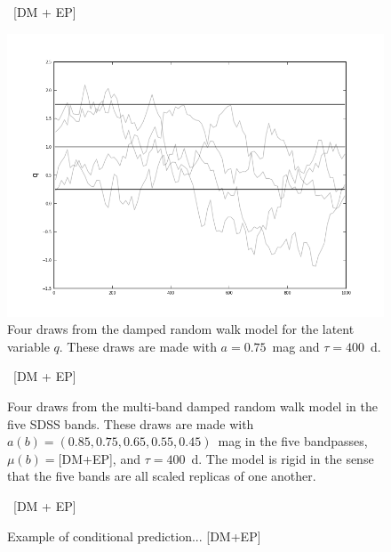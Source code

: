 \documentclass[letterpaper,12pt,preprint]{aastex}
\begin{document}
\clearpage
\begin{figure}
~[DM + EP]~
\caption{Four draws from the damped random walk model for the latent
  variable $q$.  These draws are made with $a=0.75$~mag and
  $\tau=400$~d.\label{fig:qdraws}}
\includegraphics [width=\textwidth]{latentvar.png}
\end{figure}

\begin{figure}
~[DM + EP]~
\caption{Four draws from the multi-band damped random walk model in
  the five SDSS bands.  These draws are made with $a(b)=(0.85, 0.75,
  0.65, 0.55, 0.45)$~mag in the five bandpasses, $\mu(b)=$[DM+EP], and
  $\tau=400$~d.  The model is rigid in the sense that the five bands
  are all scaled replicas of one another.\label{fig:mdraws}}
\end{figure}

\begin{figure}
~[DM + EP]~
\caption{Example of conditional
  prediction... [DM+EP]\label{fig:conditional}}
\end{figure}
\end{document}
